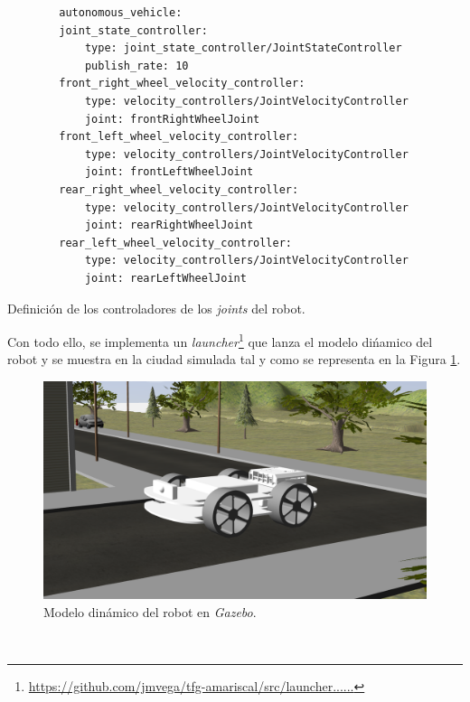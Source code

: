 \begin{code}[h]
	\begin{lstlisting}
		autonomous_vehicle:
		joint_state_controller:
			type: joint_state_controller/JointStateController
			publish_rate: 10
		front_right_wheel_velocity_controller:
			type: velocity_controllers/JointVelocityController
			joint: frontRightWheelJoint
		front_left_wheel_velocity_controller:
			type: velocity_controllers/JointVelocityController
			joint: frontLeftWheelJoint
		rear_right_wheel_velocity_controller:
			type: velocity_controllers/JointVelocityController
			joint: rearRightWheelJoint
		rear_left_wheel_velocity_controller:
			type: velocity_controllers/JointVelocityController
			joint: rearLeftWheelJoint
	\end{lstlisting}
	\caption[Definición de los controladores de los \textit{joints} del robot.]{Definición de los controladores de los \textit{joints} del robot.}
	\label{cod:controllers}
\end{code}

Con todo ello, se implementa un \textit{launcher}\footnote{\url{https://github.com/jmvega/tfg-amariscal/src/launcher......}} que lanza el modelo dińamico del robot y se muestra en la ciudad simulada tal y como se representa en la Figura \ref{fig:modelGazebo}.\\

\begin{figure} [h!]
	\begin{center}
		\includegraphics[width=12cm]{figs/modelGazebo}
	\end{center}
	\caption{Modelo dinámico del robot en \textit{Gazebo}.}
	\label{fig:modelGazebo}
\end{figure}\

